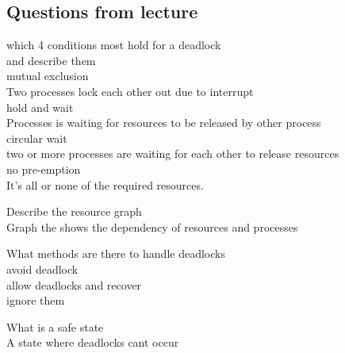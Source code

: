\documentclass[a4paper,10pt,titlepage]{report}
\begin{document}
\newpage

\subsection{Questions from lecture}
which 4 conditions most hold for a deadlock\\
\hspace{10mm} and describe them \\
\hspace{10mm} mutual exclusion\\
\hspace{20mm} Two processes lock each other out due to interrupt  \\
\hspace{10mm} hold and wait\\
\hspace{20mm} Processes is waiting for resources to be released by other process \\
\hspace{10mm} circular wait\\
\hspace{20mm} two or more processes are waiting for each other to release resources \\
\hspace{10mm} no pre-emption\\
\hspace{20mm} It's all or none of the required resources. \\
\vspace{5mm}

Describe the resource graph\\
\hspace{10mm} Graph the shows the dependency of resources and processes \\
\vspace{5mm}

What methods are there to handle deadlocks \\
\hspace{10mm} avoid deadlock \\
\hspace{10mm} allow deadlocks and recover \\
\hspace{10mm} ignore them  \\
\vspace{5mm}

What is a safe state \\
\hspace{10mm} A state where deadlocks cant occur \\
\vspace{5mm}
\end{document}
